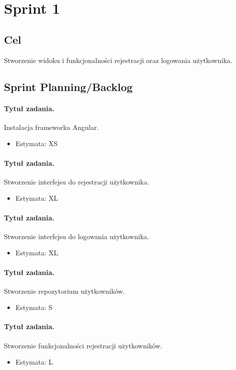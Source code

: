 \documentclass[a4paper]{article}
\begin{document}
\section{Sprint 1}
\subsection{Cel} Stworzenie widoku i funkcjonalności rejestracji oraz logowania	użytkownika.
\subsection{Sprint Planning/Backlog}

\paragraph{Tytuł zadania.} Instalacja frameworka Angular.
\begin{itemize}
\item Estymata: XS
\end{itemize}

\paragraph{Tytuł zadania.} Stworzenie interfejsu do rejestracji użytkownika.
\begin{itemize}
\item Estymata: XL
\end{itemize}

\paragraph{Tytuł zadania.} Stworzenie interfejsu do logowania użytkownika.
\begin{itemize}
\item Estymata: XL
\end{itemize}

\paragraph{Tytuł zadania.} Stworzenie repozytorium użytkowników.
\begin{itemize}
\item Estymata: S
\end{itemize}

\paragraph{Tytuł zadania.} Stworzenie funkcjonalności rejestracji użytkowników.
\begin{itemize}
\item Estymata: L
\end{itemize}
\end{document}
